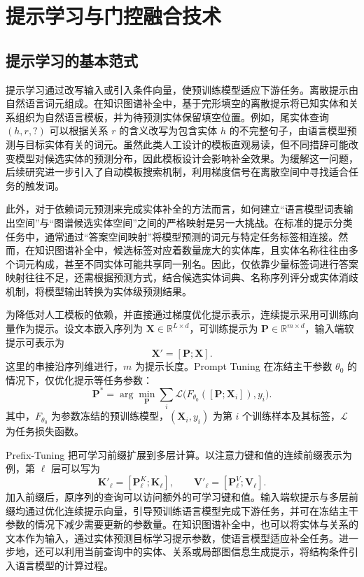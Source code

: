 \section{提示学习与门控融合技术}

\subsection{提示学习的基本范式}

提示学习通过改写输入或引入条件向量，使预训练模型适应下游任务。离散提示由自然语言词元组成。在知识图谱补全中，基于完形填空的离散提示将已知实体和关系组织为自然语言模板，并为待预测实体保留填空位置。例如，尾实体查询 $(h,r,?)$ 可以根据关系 $r$ 的含义改写为包含实体 $h$ 的不完整句子，由语言模型预测与目标实体有关的词元。虽然此类人工设计的模板直观易读，但不同措辞可能改变模型对候选实体的预测分布，因此模板设计会影响补全效果。为缓解这一问题，后续研究进一步引入了自动模板搜索机制，利用梯度信号在离散空间中寻找适合任务的触发词\cite{petroni2019language,AutoPrompt_Shin_2020}。

此外，对于依赖词元预测来完成实体补全的方法而言，如何建立“语言模型词表输出空间”与“图谱候选实体空间”之间的严格映射是另一大挑战。在标准的提示分类任务中，通常通过“答案空间映射”将模型预测的词元与特定任务标签相连接。然而，在知识图谱补全中，候选标签对应着数量庞大的实体库，且实体名称往往由多个词元构成，甚至不同实体可能共享同一别名。因此，仅依靠少量标签词进行答案映射往往不足，还需根据预测方式，结合候选实体词典、名称序列评分或实体消歧机制，将模型输出转换为实体级预测结果。

为降低对人工模板的依赖，并直接通过梯度优化提示表示，连续提示采用可训练向量作为提示。设文本嵌入序列为 $\mathbf{X}\in\mathbb{R}^{L\times d}$，可训练提示为 $\mathbf{P}\in\mathbb{R}^{m\times d}$，输入端软提示可表示为
\begin{equation}
    \mathbf{X}'=[\mathbf{P};\mathbf{X}].
    \label{eq:bg_soft_prompt}
\end{equation}
这里的串接沿序列维进行，$m$ 为提示长度。Prompt Tuning 在冻结主干参数 $\theta_0$ 的情况下，仅优化提示等任务参数\cite{lester2021power}：
\begin{equation}
    \mathbf{P}^{*}=\arg\min_{\mathbf{P}}
      \sum_i\mathcal{L}\big(F_{\theta_0}([\mathbf{P};\mathbf{X}_i]),y_i\big).
\end{equation}
其中，$F_{\theta_0}$ 为参数冻结的预训练模型，$(\mathbf{X}_i,y_i)$ 为第 $i$ 个训练样本及其标签，$\mathcal{L}$ 为任务损失函数。

Prefix-Tuning 把可学习前缀扩展到多层计算\cite{PrefixTuning_Li_2021}。以注意力键和值的连续前缀表示为例，第 $\ell$ 层可以写为
\begin{equation}
    \mathbf{K}'_{\ell}=[\mathbf{P}^{K}_{\ell};\mathbf{K}_{\ell}],\qquad
    \mathbf{V}'_{\ell}=[\mathbf{P}^{V}_{\ell};\mathbf{V}_{\ell}].
\end{equation}
加入前缀后，原序列的查询可以访问额外的可学习键和值。输入端软提示与多层前缀均通过优化连续提示向量，引导预训练语言模型完成下游任务，并可在冻结主干参数的情况下减少需要更新的参数量。在知识图谱补全中，也可以将实体与关系的文本作为输入，通过实体预测目标学习提示参数，使语言模型适应补全任务。进一步地，还可以利用当前查询中的实体、关系或局部图信息生成提示，将结构条件引入语言模型的计算过程。

